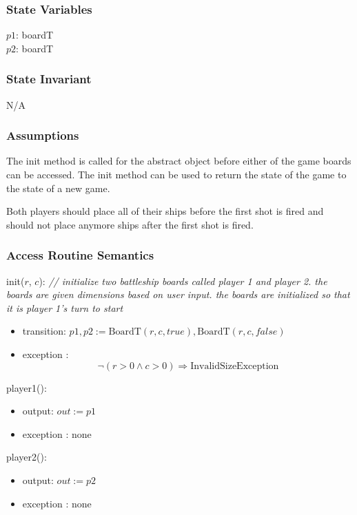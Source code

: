 \documentclass[12pt]{article}
\begin{document}
\subsubsection* {State Variables}

$p1$: boardT\\
$p2$: boardT\\

\subsubsection* {State Invariant}

N/A

\subsubsection* {Assumptions}

The init method is called for the abstract object before either of the game boards can be accessed.  The init method can be used to return the state of the game to the state of a new game.

Both players should place all of their ships before the first shot is fired and should not place anymore ships after the first shot is fired. 

\subsubsection* {Access Routine Semantics}

init($r$, $c$): {\it // initialize two battleship boards called player 1 and player 2. the boards are given dimensions based on user input. the boards are initialized so that it is player 1's turn to start}
\begin{itemize}
\item transition: $ p1, p2 := \mbox{BoardT}(r, c, true), \mbox{BoardT}(r, c, false) $
\item exception : $$ \neg (r > 0 \wedge c > 0) \Rightarrow \mbox{InvalidSizeException} $$
\end{itemize}

\noindent player1():
\begin{itemize}
\item output: $out := p1$
\item exception : none
\end{itemize}

\noindent player2():
\begin{itemize}
\item output: $out := p2$
\item exception : none
\end{itemize}
\end{document}
